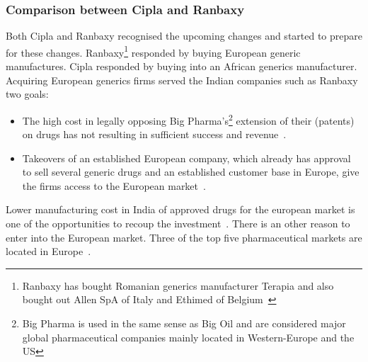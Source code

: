 \subsubsection{Comparison between Cipla and Ranbaxy}
Both Cipla and Ranbaxy recognised the upcoming changes and started to prepare for these changes.
Ranbaxy\footnote{Ranbaxy has bought Romanian generics manufacturer Terapia and also bought out Allen SpA of Italy and Ethimed of Belgium~\cite{Singapore:2006,The-Nikkei-Weekly:2006}} responded by buying European generic \pharma manufactures. 
Cipla responded by buying into an African generics manufacturer.
Acquiring European generics firms served the Indian companies such as Ranbaxy two goals:
\begin{itemize}
\item The high cost in legally opposing Big Pharma's\footnote{Big Pharma is used in the same sense as Big Oil and are considered major global pharmaceutical companies mainly located in Western-Europe and the US} extension of their (patents) on drugs has not resulting in sufficient success and revenue~\citep{Singapore:2006}.
\item Takeovers of an established European company, which already has approval to sell several generic drugs and an established customer base in Europe, give the firms access to the European market~\citep{Singapore:2006}.
\end{itemize}
Lower manufacturing cost in India of approved drugs for the european market is one of the opportunities to recoup the investment~\citep{Singapore:2006}.
There is an other reason to enter into the European market.
Three of the top five pharmaceutical markets are located in Europe~.

